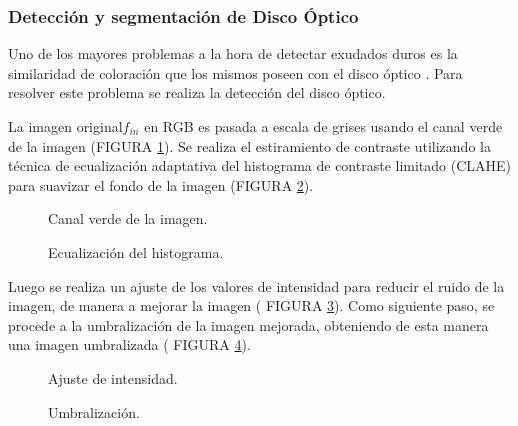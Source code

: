 \subsubsection{Detección y segmentación de Disco Óptico}
Uno de los mayores problemas a la hora de detectar exudados duros es la similaridad de coloración que los mismos poseen con el disco óptico \cite{el2013automatic}. Para resolver este problema se realiza la detección del disco óptico. 



La imagen original$f_{in}$ en RGB es pasada a escala de grises usando el canal verde de la imagen (FIGURA \ref{fig:disco_1}). Se realiza el estiramiento de contraste utilizando la técnica de ecualización adaptativa del histograma de contraste limitado (CLAHE) para suavizar el fondo de la imagen (FIGURA \ref{fig:disco_2}).

\begin{figure}[H]
\centering
{}
\caption{Canal verde de la imagen.} \label{fig:disco_1}
\end{figure}

\begin{figure}[H]
\centering
{}
\caption{Ecualización del histograma.} \label{fig:disco_2}
\end{figure}

Luego  se realiza un ajuste de los valores de intensidad para reducir el ruido de la imagen, de manera a mejorar la imagen ( FIGURA \ref{fig:disco_3}). Como siguiente paso, se procede a la umbralización de la imagen mejorada, obteniendo de esta manera una imagen umbralizada ( FIGURA \ref{fig:disco_4}).

\begin{figure}[H]
\centering
{}
\caption{Ajuste de intensidad.} \label{fig:disco_3}
\end{figure}

\begin{figure}[H]
\centering
{}
\caption{Umbralización.} \label{fig:disco_4}
\end{figure}

